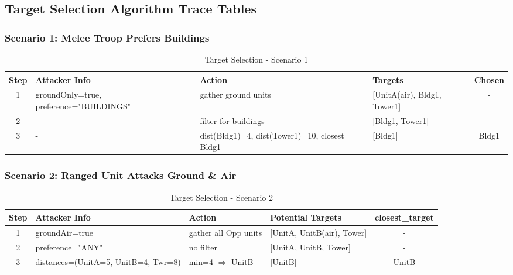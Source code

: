 \documentclass{article}
\begin{document}
\FloatBarrier

\subsection{Target Selection Algorithm Trace Tables}

\subsubsection{Scenario 1: Melee Troop Prefers Buildings}
\begin{table}[H]
\centering
\footnotesize
\begin{tabularx}{\textwidth}{|c|p{3cm}|X|p{3cm}|c|}
\hline
\textbf{Step} & \textbf{Attacker Info} & \textbf{Action} & \textbf{Targets} & \textbf{Chosen}\\
\hline
1 & groundOnly=true, preference="BUILDINGS" & gather ground units & [UnitA(air), Bldg1, Tower1] & - \\
\hline
  2 & - & filter for buildings & [Bldg1, Tower1] & - \\
\hline
  3 & - & dist(Bldg1)=4, dist(Tower1)=10, closest = Bldg1 & [Bldg1] & Bldg1 \\
\hline
\end{tabularx}
\caption{Target Selection - Scenario 1}
\end{table}

\subsubsection{Scenario 2: Ranged Unit Attacks Ground \& Air}
\begin{table}[H]
\centering
\footnotesize
\begin{tabularx}{\textwidth}{|c|p{3cm}|X|p{3cm}|c|}
\hline
\textbf{Step} & \textbf{Attacker Info} & \textbf{Action} & \textbf{Potential Targets} & \textbf{closest\_target}\\
\hline
1 & groundAir=true & gather all Opp units & [UnitA, UnitB(air), Tower] & - \\
\hline
2 & preference="ANY" & no filter & [UnitA, UnitB, Tower] & - \\
\hline
  3 & distances=(UnitA=5, UnitB=4, Twr=8) & min=4 $\Rightarrow$ UnitB & [UnitB] & UnitB \\
\hline
\end{tabularx}
\caption{Target Selection - Scenario 2}
\end{table}
\end{document}
